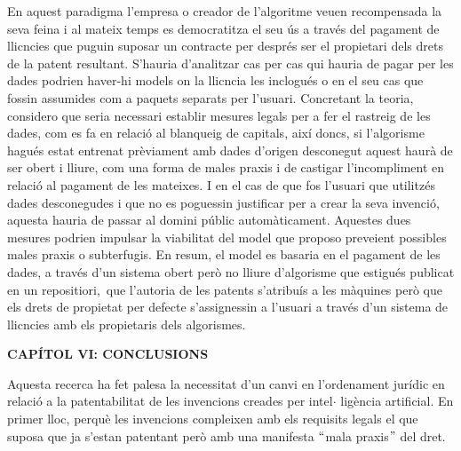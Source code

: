 \documentclass[12pt]{article}
\renewcommand{\_}{\kern-1.5pt\textunderscore\kern-1.5pt}
\begin{document}
\begin{itemize}
\vspace{\baselineskip}
\begin{justify}
En aquest paradigma l’empresa o creador de l’algoritme veuen recompensada la seva feina i al mateix temps es democratitza el seu ús a través del pagament de llicncies que puguin suposar un contracte per després ser el propietari dels drets de la patent resultant. S’hauria d’analitzar cas per cas qui hauria de pagar per les dades podrien haver-hi models on la llicncia les inclogués o en el seu cas que fossin assumides com a paquets separats per l’usuari. Concretant la teoria, considero que seria necessari establir mesures legals per a fer el rastreig de les dades, com es fa en relació al blanqueig de capitals, així doncs, si l’algorisme hagués estat entrenat prèviament amb dades d’origen desconegut aquest haurà de ser obert i lliure, com una forma de males praxis i de castigar l’incompliment en relació al pagament de les mateixes. I en el cas de que fos l’usuari que utilitzés dades desconegudes i que no es poguessin justificar per a crear la seva invenció, aquesta hauria de passar al domini públic automàticament. Aquestes dues mesures podrien impulsar la viabilitat del model que proposo preveient possibles males praxis o subterfugis.  En resum, el model es basaria en el pagament de les dades, a través d’un sistema obert però no lliure d’algorisme que estigués publicat en un repositiori,\ que l’autoria de les patents  s’atribuís a les màquines però que els drets de propietat per defecte s’assignessin a l’usuari a través d’un sistema de llicncies amb els propietaris dels algorismes. 
\end{justify}\par


\vspace{\baselineskip}

\vspace{\baselineskip}
\begin{Center}
{\fontsize{16pt}{19.2pt}\selectfont \textbf{CAPÍTOL VI: CONCLUSIONS}\par}
\end{Center}\par


\vspace{\baselineskip}
\begin{justify}
Aquesta recerca ha fet palesa la necessitat d’un canvi en l’ordenament jurídic en relació a la patentabilitat de les invencions creades per intel$ \cdot $ ligència artificial. En primer lloc, perquè les invencions compleixen amb els requisits legals el que suposa que ja s’estan patentant però amb una manifesta $``$mala praxis$"$  del dret. 
\end{justify}\par



\end{itemize}
\end{document}
